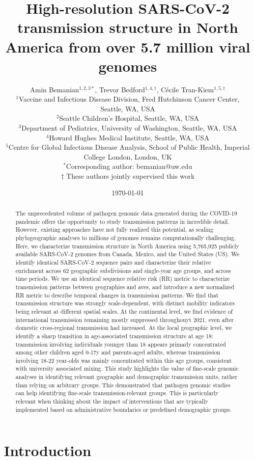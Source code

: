 \documentclass[11pt, letterpaper, oneside]{article}
\title{High-resolution SARS-CoV-2 transmission structure in North America from over 5.7 million viral genomes}
\author{
    Amin Bemanian$^{1,2,3*}$,
    Trevor Bedford$^{1,4,\dagger}$,
    Cécile Tran-Kiem$^{1,5,\dagger}$\\[1ex]
    \small $^1$Vaccine and Infectious Disease Division, Fred Hutchinson Cancer Center, Seattle, WA, USA\\
    \small $^2$Seattle Children's Hospital, Seattle, WA, USA\\
    \small $^3$Department of Pediatrics, University of Washington, Seattle, WA, USA\\
    \small $^4$Howard Hughes Medical Institute, Seattle, WA, USA\\
    \small $^5$Centre for Global Infectious Disease Analysis, School of Public Health, Imperial College London, London, UK\\[1ex]
    \small $^*$Corresponding author: bemanian@uw.edu\\
    \small $\dagger$ These authors jointly supervised this work
}
\date{\today}
\begin{document}
\linenumbers

\maketitle
\begin{abstract}
The unprecedented volume of pathogen genomic data generated during the COVID-19 pandemic offers the opportunity to study transmission patterns in incredible detail.
However, existing approaches have not fully realized this potential, as scaling phylogeographic analyses to millions of genomes remains computationally challenging.
Here, we characterize transmission structure in North America using 5,765,925 publicly available SARS-CoV-2 genomes from Canada, Mexico, and the United States (US).
We identify identical SARS-CoV-2 sequence pairs and characterize their relative enrichment across 62 geographic subdivisions and single-year age groups, and across time periods.
We use an identical sequence relative risk (RR) metric to characterize transmission patterns between geographies and aves, and introduce a new normalized RR metric to describe temporal changes in transmission patterns.
We find that transmission structure was strongly scale-dependent, with distinct mobility indicators being relevant at different spatial scales.
At the continental level, we find evidence of international transmission remaining mostly suppressed throughouyt 2021, even after domestic cross-regional transmission had increased. 
At the local geographic level, we identify a sharp transition in age-associated transmission structure at age 18: transmission involving individuals younger than 18 appears primarly concentrated among other children aged 0-17y and parents-aged adults, whereas transmission involving 18-22 year-olds was mainly concentrated within this age groups, consistent with university associated mixing. 
This study highlights the value of fine-scale genomic analyses in identifying relevant geographic and demographic transmission units, rather than relying on arbitrary groups.
This demonstrated that pathogen genomic studies can help identifying fine-scale transmission-relevant groups.
This is particularly relevant when thinking about the impact of interventions that are typically implemented based on administrative boundaries or predefined demographic groups.
\end{abstract}

\section{Introduction}
\end{document}
